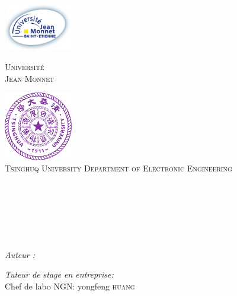 
\begin{titlepage}

\begin{center}

\begin{minipage}[t]{0.48\textwidth}
  \begin{flushleft}
    \includegraphics [width=30mm]{images/logo-univ.png} \\[0.5cm]
    \begin{spacing}{1.5}
      \textsc{\LARGE Université\\ Jean Monnet}
    \end{spacing}
  \end{flushleft}
\end{minipage}
\begin{minipage}[t]{0.48\textwidth}
  \begin{flushright}
    \includegraphics [width=30mm]{images/Tsinghua_University_Logo.png} \\[0.5cm]
    \textsc{\LARGE Tsinghuq University \large Department of Electronic Engineering}
  \end{flushright}
\end{minipage}\\ [3.5ex]

\textsc{\Large \reportsubject}\\[0.2cm]
\HRule \\[0.4cm]
{\huge \bfseries \reporttitle}\\[0.2ex]
\HRule \\[25.5ex]

\begin{minipage}[t]{0.3\textwidth}
  \begin{flushleft} \large
    \emph{Auteur :}\\
    \reportauthor
  \end{flushleft}
\end{minipage}
\begin{minipage}[t]{0.6\textwidth}
  \begin{flushright} \large
    \emph{Tuteur de stage en entreprise:} \\
    Chef de labo NGN: yongfeng \textsc{huang} \\
    

\end{flushright}
\end{minipage}
\end{center}
\end{titlepage}
